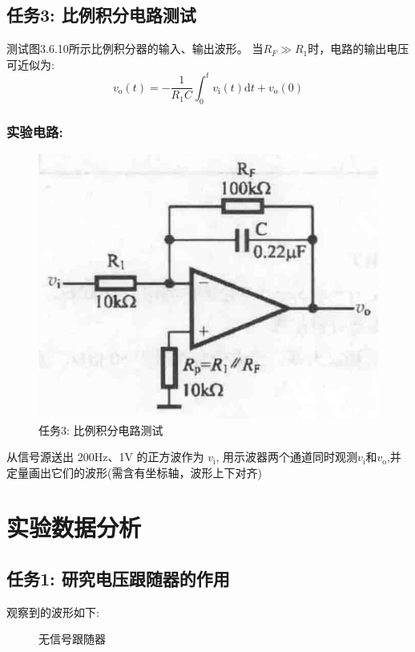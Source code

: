 \documentclass[a4paper,11pt,UTF8]{article}
\begin{document}
\subsection{任务3: 比例积分电路测试}
测试图3.6.10所示比例积分器的输入、输出波形。 当$R_F\gg R_1$时，电路的输出电压可近似为:
$$
	v_{\mathrm{o}}(t)=-\frac{1}{R_{1}C}\int_{0}^{t}v_{\mathrm{i}}(t)\mathrm{d}t+v_{\mathrm{o}}(0)
$$
\subsubsection{实验电路:}
\begin{figure}[H]
	\centering
	\includegraphics[scale=0.18]{1.4}
	\caption*{任务3: 比例积分电路测试}
\end{figure}
从信号源送出 200Hz、1V 的正方波作为 $v_\mathrm{i}$, 用示波器两个通道同时观测$v_\mathrm{i}$和$v_\mathrm{o}$,并定量画出它们的波形(需含有坐标轴，波形上下对齐)
\section{实验数据分析}
\subsection{任务1: 研究电压跟随器的作用}
观察到的波形如下:
\begin{figure}[H]
	\centering
	\setcounter{subfigure}{0}
	
	\caption*{无信号跟随器}
\end{figure}
\end{document}
